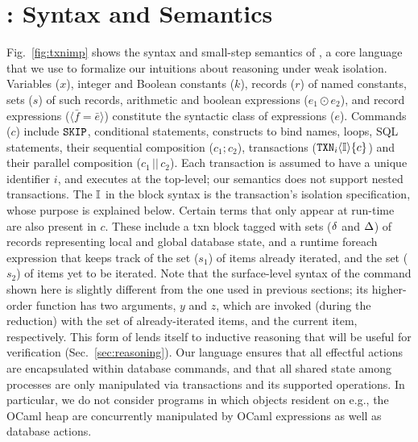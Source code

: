 \section{\txnimp: Syntax and Semantics}
\label{sec:opsem}

\label{sec:syntax}



Fig.~\ref{fig:txnimp} shows the syntax and small-step semantics of
\txnimp, a core language that we use to formalize our intuitions about
reasoning under weak isolation. Variables ($x$), integer and Boolean
constants ($k$), records ($r$) of named constants, sets ($s$) of such
records, arithmetic and boolean expressions ($e_1 \odot e_2$), and
record expressions ($\langle \bar{f}=\bar{e} \rangle$) constitute the
syntactic class of expressions ($e$). Commands ($c$) include ${\tt SKIP}$,
conditional statements,  constructs to bind names, 
loops, SQL statements, their sequential composition ($c_1;c_2$),
transactions (${\tt TXN}_{i}\langle \mathbb{I} \rangle\{c\}$) and their parallel composition
($c_1\,||\,c_2$). Each transaction is assumed to have a unique
identifier $i$, and executes at the top-level; our semantics does not
support nested transactions. The $\mathbb{I}$ in the  block syntax is
the transaction's isolation specification, whose purpose is explained
below.  Certain terms that only appear at run-time are also present in
$c$.  These include a {\sf txn} block tagged with sets ($\delta$ and
$\Delta$) of records representing local and global database state, and a
runtime {\sf foreach} expression that keeps track of the set ($s_1$)
of items already iterated, and the set ($s_2$) of items yet to be
iterated. Note that the surface-level syntax of the 
command shown here is slightly different from the one used in previous
sections; its higher-order function has two arguments, $y$ and $z$,
which are invoked (during the reduction) with the set of
already-iterated items, and the current item, respectively. This form
of  lends itself to inductive reasoning that will be useful
for verification (Sec.~\ref{sec:reasoning}).  Our language ensures
that all effectful actions are encapsulated within database commands,
and that all shared state among processes are only manipulated via
transactions and its supported operations.  In particular, we do not
consider programs in which objects resident on e.g., the OCaml heap
are concurrently manipulated by OCaml expressions as well as database
actions.



